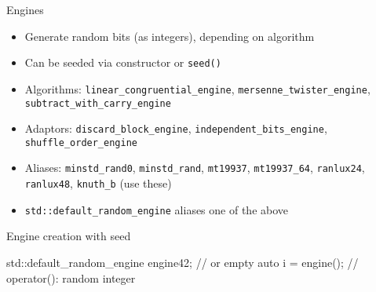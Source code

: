 \begin{frame}[fragile]
  \begin{block}{Engines}
    \begin{itemize}
      \item Generate random bits (as integers), depending on algorithm
      \item Can be seeded via constructor or \texttt{seed()}
      \item Algorithms:
        {\footnotesize \texttt{linear_congruential_engine}, \texttt{mersenne_twister_engine}, \texttt{subtract_with_carry_engine}}
      \item Adaptors:
        {\footnotesize \texttt{discard_block_engine}, \texttt{independent_bits_engine}, \texttt{shuffle_order_engine}}
      \item Aliases:
        {\footnotesize \texttt{minstd_rand0}, \texttt{minstd_rand}, \texttt{mt19937}, \texttt{mt19937_64}, \texttt{ranlux24}, \texttt{ranlux48}, \texttt{knuth_b}} (use these)
      \item \texttt{std::default_random_engine} aliases one of the above
    \end{itemize}
  \end{block}
  \begin{exampleblock}{Engine creation with seed}
    \begin{cppcode}
      std::default_random_engine engine{42}; // or empty
      auto i = engine(); // operator(): random integer
    \end{cppcode}
  \end{exampleblock}
\end{frame}

